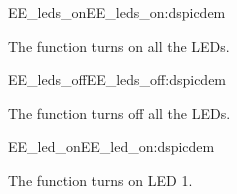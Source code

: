 \begin{function_nopb2}{EE\_leds\_on}{EE_leds_on:dspicdem}
  
  \begin{fundescription}
    The function turns on all the LEDs.
  \end{fundescription}
  
  
  
\end{function_nopb2}

\begin{function_nopb2}{EE\_leds\_off}{EE_leds_off:dspicdem}
  
  \begin{fundescription}
    The function turns off all the LEDs.
  \end{fundescription}
  
  
  
\end{function_nopb2}


\begin{function_nopb2}{EE\_led\_on}{EE_led_on:dspicdem}
  
  \begin{fundescription}
    The function turns on LED 1.
  \end{fundescription}
  
  
  
\end{function_nopb2}

